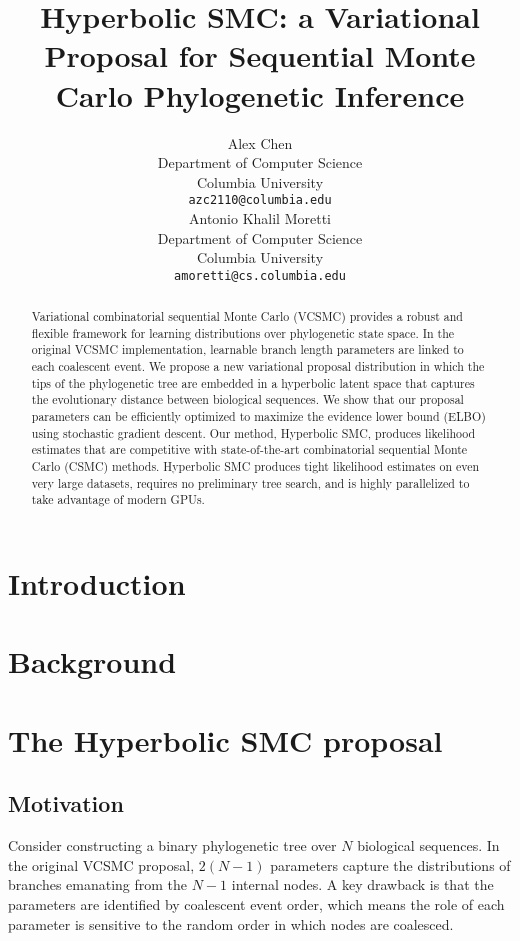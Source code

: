 \documentclass{article}
\title{Hyperbolic SMC: a Variational Proposal for Sequential Monte Carlo Phylogenetic Inference}
\author{%
  Alex Chen \\
  Department of Computer Science \\
  Columbia University \\
  \texttt{azc2110@columbia.edu} \\
  \And
  Antonio Khalil Moretti \\
  Department of Computer Science \\
  Columbia University \\
  \texttt{amoretti@cs.columbia.edu} \\
}
\begin{document}
\maketitle


\begin{abstract}
  Variational combinatorial sequential Monte Carlo (VCSMC) provides a robust and flexible framework for learning distributions over phylogenetic state space. In the original VCSMC implementation, learnable branch length parameters are linked to each coalescent event. We propose a new variational proposal distribution in which the tips of the phylogenetic tree are embedded in a hyperbolic latent space that captures the evolutionary distance between biological sequences. We show that our proposal parameters can be efficiently optimized to maximize the evidence lower bound (ELBO) using stochastic gradient descent. Our method, Hyperbolic SMC, produces likelihood estimates that are competitive with state-of-the-art combinatorial sequential Monte Carlo (CSMC) methods. Hyperbolic SMC produces tight likelihood estimates on even very large datasets, requires no preliminary tree search, and is highly parallelized to take advantage of modern GPUs.
\end{abstract}

\section{Introduction}


\section{Background}


\section{The Hyperbolic SMC proposal}


\subsection{Motivation}


Consider constructing a binary phylogenetic tree over $N$ biological sequences. In the original VCSMC proposal, $2(N-1)$ parameters capture the distributions of branches emanating from the $N-1$ internal nodes. A key drawback is that the parameters are identified by coalescent event order, which means the role of each parameter is sensitive to the random order in which nodes are coalesced.
\end{document}
